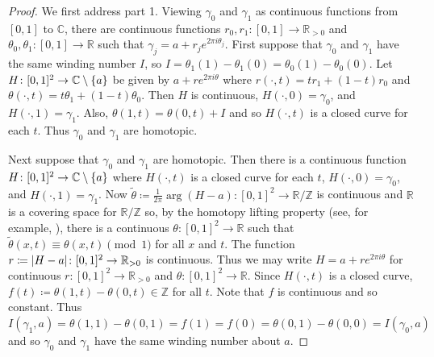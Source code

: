 \documentclass[a4paper,11pt]{article}
\DeclarePairedDelimiter{\abs}{\lvert}{\rvert} %
\DeclarePairedDelimiter{\set}{\lbrace}{\rbrace} %
\newcommand{\RR}{\mathbb{R}}
\begin{document}
\begin{proof}
    We first address part 1. Viewing $\gamma_0$ and $\gamma_1$ as continuous functions from $[0, 1]$ to $\mathbb{C}$, there are continuous functions $r_0, r_1 \colon [0, 1] \to \RR_{>0}$ and $\theta_0, \theta_1 \colon [0, 1] \to \RR$ such that $\gamma_j = a + r_j e^{2 \pi i \theta_j}$. First suppose that $\gamma_0$ and $\gamma_1$ have the same winding number $I$, so $I = \theta_1(1) - \theta_1(0) = \theta_0(1) - \theta_0(0)$. Let $H \colon [0, 1]^2 \to \mathbb{C} \setminus \set{a}$ be given by $a + r e^{2 \pi i \theta}$ where $r(\cdot, t) = t r_1 + (1 - t) r_0$ and $\theta(\cdot , t) = t \theta_1 + (1 - t) \theta_0$. Then $H$ is continuous, $H(\cdot, 0) = \gamma_0$, and $H(\cdot , 1) = \gamma_1$. Also, $\theta(1, t) = \theta(0, t) + I$ and so $H(\cdot, t)$ is a closed curve for each $t$. Thus $\gamma_0$ and $\gamma_1$ are homotopic.
    
    Next suppose that $\gamma_0$ and $\gamma_1$ are homotopic. Then there is a continuous function $H \colon [0, 1]^2 \to \mathbb{C} \setminus \set{a}$ where $H(\cdot, t)$ is a closed curve for each $t$, $H(\cdot, 0) = \gamma_0$, and $H(\cdot, 1) = \gamma_1$. Now $\tilde{\theta} \coloneqq \frac{1}{2 \pi }\arg(H - a) \colon [0, 1]^2 \to \RR/\mathbb{Z}$ is continuous and $\RR$ is a covering space for $\RR/\mathbb{Z}$ so, by the homotopy lifting property (see, for example, \citep[Prop~1.30]{Hatcher02}), there is a continuous $\theta \colon [0, 1]^2 \to \RR$ such that $\tilde{\theta}(x, t) \equiv \theta(x, t) \pmod{1}$ for all $x$ and $t$. The function $r \coloneqq \abs{H - a} \colon [0, 1]^2 \to \RR_{>0}$ is continuous. Thus we may write $H = a + r e^{2 \pi i \theta}$ for continuous $r \colon [0, 1]^2 \to \RR_{> 0}$ and $\theta \colon [0, 1]^2 \to \RR$. Since $H(\cdot, t)$ is a closed curve, $f(t) \coloneqq \theta(1, t) - \theta(0, t) \in \mathbb{Z}$ for all $t$. Note that $f$ is continuous and so constant. Thus $I(\gamma_1, a) = \theta(1, 1) - \theta(0, 1) = f(1) = f(0) = \theta(0, 1) - \theta(0, 0) = I(\gamma_0, a)$ and so $\gamma_0$ and $\gamma_1$ have the same winding number about $a$.
    

\end{proof}
\end{document}
